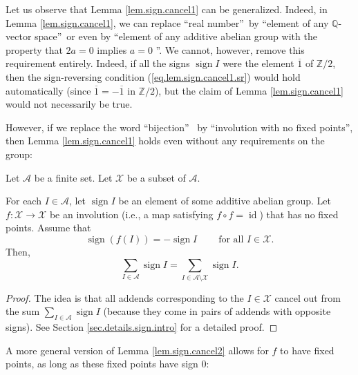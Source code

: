 Let us observe that Lemma \ref{lem.sign.cancel1} can be generalized. Indeed,
in Lemma \ref{lem.sign.cancel1}, we can replace \textquotedblleft real
number\textquotedblright\ by \textquotedblleft element of any $\mathbb{Q}%
$-vector space\textquotedblright\ or even by \textquotedblleft element of any
additive abelian group with the property that $2a=0$ implies $a=0$%
\textquotedblright. We cannot, however, remove this requirement entirely.
Indeed, if all the signs $\operatorname*{sign}I$ were the element
$\overline{1}$ of $\mathbb{Z}/2$, then the sign-reversing condition
(\ref{eq.lem.sign.cancel1.sr}) would hold automatically (since $\overline
{1}=-\overline{1}$ in $\mathbb{Z}/2$), but the claim of Lemma
\ref{lem.sign.cancel1} would not necessarily be true.

However, if we replace the word \textquotedblleft bijection\textquotedblright%
\ by \textquotedblleft involution with no fixed points\textquotedblright, then
Lemma \ref{lem.sign.cancel1} holds even without any requirements on the group:

\begin{lemma}
\label{lem.sign.cancel2}Let $\mathcal{A}$ be a
finite set. Let $\mathcal{X}$ be a subset of $\mathcal{A}$.

For each $I\in\mathcal{A}$, let $\operatorname*{sign}I$ be an element of some
additive abelian group. Let $f:\mathcal{X}\rightarrow\mathcal{X}$ be an
involution (i.e., a map satisfying $f\circ f=\operatorname*{id}$) that has no
fixed points. Assume that%
\[
\operatorname*{sign}\left(  f\left(  I\right)  \right)  =-\operatorname*{sign}%
I\ \ \ \ \ \ \ \ \ \ \text{for all }I\in\mathcal{X}.
\]
Then,%
\[
\sum_{I\in\mathcal{A}}\operatorname*{sign}I=\sum_{I\in\mathcal{A}%
\setminus\mathcal{X}}\operatorname*{sign}I.
\]

\end{lemma}

\begin{proof}
The idea is that all addends corresponding to the $I\in\mathcal{X}$ cancel out
from the sum $\sum_{I\in\mathcal{A}}\operatorname*{sign}I$ (because they come
in pairs of addends with opposite signs). See Section
\ref{sec.details.sign.intro} for a detailed proof.
\end{proof}

A more general version of Lemma \ref{lem.sign.cancel2} allows for $f$ to have
fixed points, as long as these fixed points have sign $0$:

